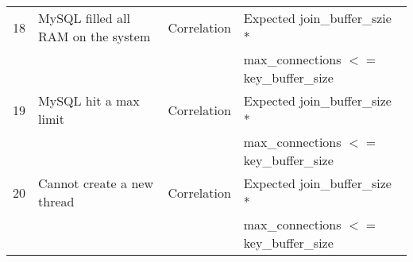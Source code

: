 \begin{table*}[tbp]
\begin{small}
\begin{tabular}{|l|l|l|l|}
18 & MySQL filled all RAM on the system
& Correlation
& Expected join\_buffer\_szie * \\ & && max\_connections $<=$ key\_buffer\_size \\ \hline


19 & MySQL hit a max limit
& Correlation
& Expected join\_buffer\_size * \\ &&& max\_connections $<=$ key\_buffer\_size \\ \hline

20 & Cannot create a new thread
& Correlation
& Expected join\_buffer\_size * \\ &&& max\_connections $<=$ key\_buffer\_size \\ \hline

\end{tabular}
\end{small}
\end{table*}


